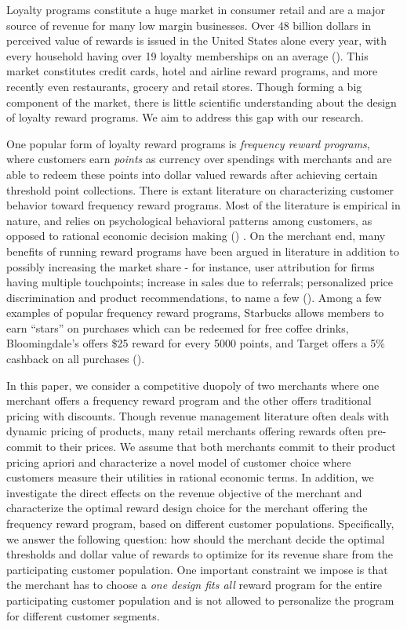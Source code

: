 Loyalty programs constitute a huge market in consumer retail and are a major source of revenue for many low margin businesses.
Over 48 billion dollars in perceived value of rewards is issued in the United States alone every year, with every household having over 19 loyalty memberships on an average (\cite{berry2013loyalty}).
This market constitutes credit cards, hotel and airline reward programs, and more recently even restaurants, grocery and retail stores.
Though forming a big component of the market, there is little scientific understanding about the design of loyalty reward programs. We aim to address this gap with our research.

One popular form of loyalty reward programs is \emph{frequency reward programs}, where customers earn \emph{points} as currency over spendings with merchants and are able to redeem these points into dollar valued rewards after achieving certain threshold point collections.
There is extant literature on characterizing customer behavior toward frequency reward programs.
Most of the literature is empirical in nature, and relies on psychological behavioral patterns among customers, as opposed to rational economic decision making (\cite{kivetz2006goal,dreze2004using,gao2014influence}) .
On the merchant end, many benefits of running reward programs have been argued in literature in addition to possibly increasing the market share - for instance, user attribution for firms having multiple touchpoints; increase in sales due to referrals; personalized price discrimination and product recommendations, to name a few (\cite{ryu2007penny}).
Among a few examples of popular frequency reward programs, Starbucks allows members to earn ``stars'' on purchases which can be redeemed for free coffee drinks, Bloomingdale's offers \$25 reward for every 5000 points, and Target offers a 5\% cashback on all purchases (\cite{cvs2015target}).

In this paper, we consider a competitive duopoly of two merchants where one merchant offers a frequency reward program and the other offers traditional pricing with discounts.
Though revenue management literature often deals with dynamic pricing of products, many retail merchants offering rewards often pre-commit to their prices. 
We assume that both merchants commit to their product pricing apriori and characterize a novel model of customer choice where customers measure their utilities in rational economic terms.
In addition, we investigate the direct effects on the revenue objective of the merchant and characterize the optimal reward design choice for the merchant offering the frequency reward program, based on different customer populations.
Specifically, we answer the following question: how should the merchant decide the optimal thresholds and dollar value of rewards to optimize for its revenue share from the participating customer population.
One important constraint we impose is that the merchant has to choose a \emph{one design fits all} reward program for the entire participating customer population and is not allowed to personalize the program for different customer segments.

